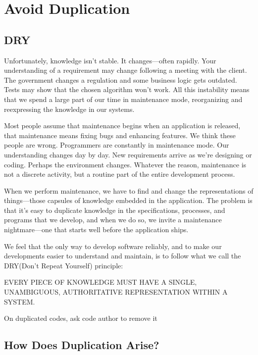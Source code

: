 
\chapter{Avoid Duplication}

\section{DRY}

Unfortunately, knowledge isn’t stable. It changes—often rapidly. Your understanding of a requirement may change following a meeting with the client. The government changes a regulation and some business logic gets outdated. Tests may show that the chosen algorithm won’t work. All this instability means that we spend a large part of our time in maintenance mode, reorganizing and reexpressing the knowledge in our systems.

Most people assume that maintenance begins when an application is released, that maintenance means fixing bugs and enhancing features. We think these people are wrong. Programmers are constantly in maintenance mode. Our understanding changes day by day. New requirements arrive as we’re designing or coding. Perhaps the environment changes. Whatever the reason, maintenance is not a discrete activity, but a routine part of the entire development process.

When we perform maintenance, we have to find and change the representations of things—those capsules of knowledge embedded in the application. The problem is that it’s easy to duplicate knowledge in the specifications, processes, and programs that we develop, and when we do so, we invite a maintenance nightmare—one that starts well before the application ships.

We feel that the only way to develop software reliably, and to make our developments easier to understand and maintain, is to follow what we call the DRY(Don’t Repeat Yourself) principle:

\begin{remark}
EVERY PIECE OF KNOWLEDGE MUST HAVE A SINGLE, UNAMBIGUOUS, AUTHORITATIVE REPRESENTATION WITHIN A SYSTEM.
\end{remark}

\begin{marker}
On duplicated codes, ask code author to remove it
\end{marker}

\section{How Does Duplication Arise?}

